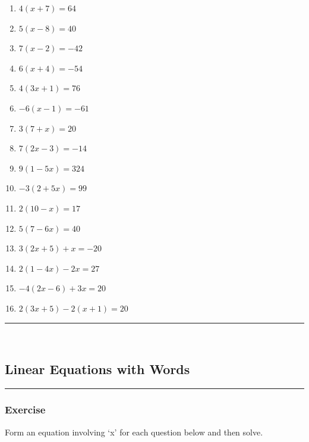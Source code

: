 \documentclass[a4paper,12pt]{article}
\newcommand\question{
	 \rule[0pt]{17cm}{0.5pt}\vspace{-0.5cm}
	\subsubsection{Exercise}

}
\newcommand\questionend{
	\rule[0pt]{17cm}{0.5pt}\vspace{0.0cm}\\
}
\begin{document}
\begin{multicols}{2}
	\begin{enumerate}[label=\normalsize \alph*)~~~]
\item $4(x + 7) = 64$
\item $5(x - 8) = 40$
\item $7(x - 2) = -42$
\item $6(x + 4) = -54$
\item $4(3x + 1) = 76$
\item $-6(x - 1) = -61$
\item $3(7 + x) = 20$
\item $7(2x - 3) = -14$
\item $9(1 - 5x) = 324$
\item $-3(2 + 5x) = 99$
\item $2(10 - x) = 17$
\item $5(7 - 6x) = 40$
\item $3(2x + 5) + x = -20$
\item $2(1 - 4x) - 2x = 27$
\item $-4(2x - 6) + 3x = 20$
\item $2(3x + 5) - 2(x + 1) = 20$
\end{enumerate}
\end{multicols}
\questionend\vspace{-1cm}
\subsection{Linear Equations with Words}
\question
Form an equation involving ‘x’ for each question below and then solve.
\end{document}

